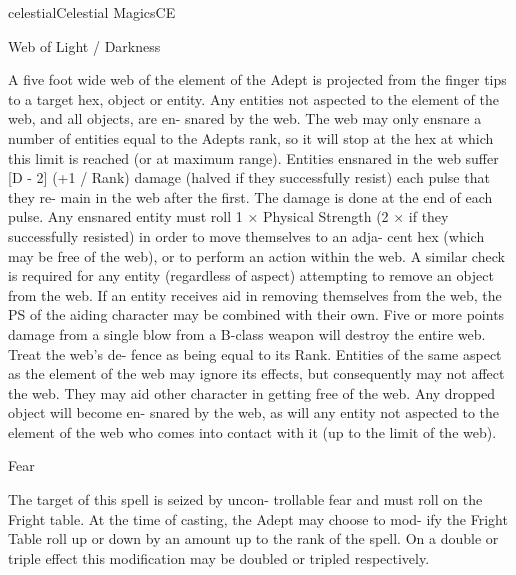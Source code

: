 \begin{College}[1.3]{celestial}{Celestial Magics}{CE}
\begin{spell}[S-6]{Web of Light / Darkness}
\begin{effects}
A five foot wide web of the element of the 
Adept  is  projected  from  the  finger  tips  to  a  target 
hex,  object  or  entity.  Any  entities  not  aspected  to 
the  element  of  the  web,  and  all  objects,  are  en-
snared  by  the  web.  The  web  may  only  ensnare  a 
number  of  entities  equal  to  the  Adepts  rank,  so  it 
will  stop  at  the  hex  at  which  this  limit  is  reached 
(or  at  maximum  range).  Entities  ensnared  in  the 
web  suffer  [D  -  2]  (+1  /  Rank)  damage  (halved  if 
they  successfully  resist)  each  pulse  that  they  re-
main in the web after the first. The damage is done 
at the end of each pulse. Any ensnared entity must 
roll 1 × Physical Strength (2 × if they successfully 
resisted)  in  order  to  move  themselves  to  an  adja-
cent  hex  (which  may  be  free  of  the  web),  or  to 
perform an action within the web. A similar check 
is  required  for  any  entity  (regardless  of  aspect) 
attempting to remove an object from the web. If an 
entity  receives  aid  in  removing  themselves  from 
the  web,  the  PS  of  the  aiding  character  may  be 
combined  with  their  own.  Five  or  more  points 
damage from a single blow from a B-class weapon 
will  destroy  the  entire  web.  Treat  the  web’s  de-
fence  as  being  equal  to  its  Rank.  Entities  of  the 
same aspect as the element of the web may ignore 
its  effects,  but  consequently  may  not  affect  the 
web.  They  may  aid  other  character  in  getting  free 
of  the  web.  Any  dropped  object  will  become  en-
snared by  the  web,  as  will  any  entity  not  aspected 
to  the  element  of  the  web  who  comes  into  contact 
with it (up to the limit of the web). 

\end{effects}
\end{spell}

\begin{spell}[S-7]{Fear }

\begin{effects}
The target of this spell is seized by uncon-
trollable  fear  and  must  roll  on  the  Fright  table.  At 
the time of casting, the Adept may choose to mod-
ify the Fright Table roll up or down by an amount 
up  to  the  rank  of  the  spell.  On  a  double  or  triple 
effect  this  modification  may  be  doubled  or  tripled 
respectively. 


\end{effects}
\end{spell}
\end{College}
